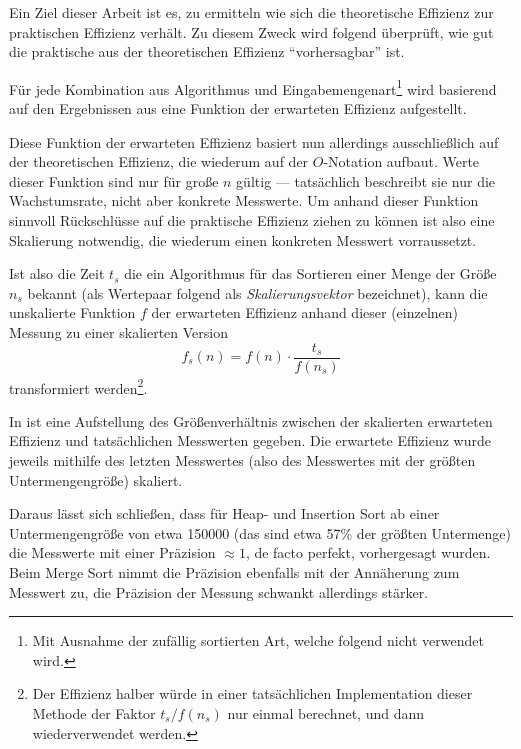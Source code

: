 Ein Ziel dieser Arbeit ist es, zu ermitteln wie sich die theoretische Effizienz zur praktischen Effizienz verhält. Zu diesem Zweck wird folgend überprüft, wie gut die praktische aus der theoretischen Effizienz \enquote{vorhersagbar} ist.

Für jede Kombination aus Algorithmus und Eingabemengenart\footnote{Mit Ausnahme der zufällig sortierten Art, welche folgend nicht verwendet wird.} wird basierend auf den Ergebnissen aus  eine Funktion der erwarteten Effizienz aufgestellt.

Diese Funktion der erwarteten Effizienz basiert nun allerdings ausschließlich auf der theoretischen Effizienz, die wiederum auf der $O$-Notation aufbaut. Werte dieser Funktion sind nur für große $n$ gültig --- tatsächlich beschreibt sie nur die Wachstumsrate, nicht aber konkrete Messwerte. Um anhand dieser Funktion sinnvoll Rückschlüsse auf die praktische Effizienz ziehen zu können ist also eine Skalierung notwendig, die wiederum einen konkreten Messwert vorraussetzt.

Ist also die Zeit $t_s$ die ein Algorithmus für das Sortieren einer Menge der Größe $n_s$ bekannt (als Wertepaar folgend als \emph{Skalierungsvektor} bezeichnet), kann die unskalierte Funktion $f$ der erwarteten Effizienz anhand dieser (einzelnen) Messung zu einer skalierten Version
\begin{equation*}
    f_s(n) = f(n) \cdot \frac{t_s}{f(n_s)}
\end{equation*}
transformiert werden\footnote{Der Effizienz halber würde in einer tatsächlichen Implementation dieser Methode der Faktor $t_s / f(n_s)$ nur einmal berechnet, und dann wiederverwendet werden.}.



In  ist eine Aufstellung des Größenverhältnis zwischen der skalierten erwarteten Effizienz und tatsächlichen Messwerten gegeben. Die erwartete Effizienz wurde jeweils mithilfe des letzten Messwertes (also des Messwertes mit der größten Untermengengröße) skaliert.

Daraus lässt sich schließen, dass für Heap- und Insertion Sort ab einer Untermengengröße von etwa 150000 (das sind etwa 57\% der größten Untermenge) die Messwerte mit einer Präzision $\approx 1$, de facto perfekt, vorhergesagt wurden. Beim Merge Sort nimmt die Präzision ebenfalls mit der Annäherung zum Messwert zu, die Präzision der Messung schwankt allerdings stärker.

